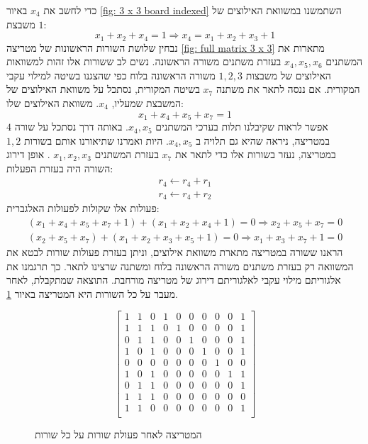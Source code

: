 \documentclass[12pt,leqno]{article}
\theoremstyle{theoremdd}
\begin{document}
כדי לחשב את 
$x_4$
באיור
\ref{fig: 3 x 3 board indexed}
השתמשנו במשוואת האילוצים של 
משבצת 
$1$:
\[
    x_1 + x_2 + x_4 = 1 \Rightarrow x_4 = x_1 + x_2 + x_3 + 1
\]
נבחין שלושת השורות הראשונות  
של מטריצה 
\ref{fig: full matrix 3 x 3}
מתארות את המשתנים 
$x_4, x_5, x_6$
בעזרת משתנים 
משורה הראשונה.
נשים לב ששורות אלו זהות למשוואות האילוצים של משבצות
$1,2,3$
משורה הראשונה
בלוח כפי שהצגנו בשיטה למילוי עקבי המקורית.
אם ננסה לתאר 
את משתנה 
$x_7$
בשיטה המקורית, נסתכל על משוואת האילוצים של המשבצת שמעליו,
$x_4$.
משוואת האילוצים שלו:
\[ x_1 + x_4 + x_5 + x_7 = 1 \]
אפשר לראות שקיבלנו תלות בערכי המשתנים 
$x_4, x_5$.
באותה דרך 
נסתכל על שורה 
$4$
במטריצה,
ניראה שהיא גם תלויה ב
$x_4, x_5$.
היות 
ואמרנו שתיאורנו אותם בשורות 
$1, 2$
במטריצה,
נעזר בשורות אלו כדי לתאר את 
$x_7$
בעזרת המשתנים 
$x_1, x_2, x_3$
.
אופן דירוג השורה היה בעזרת
הפעלות:
\begin{align*}
    r_4 \leftarrow r_4 + r_1
    \\
    r_4 \leftarrow r_4 + r_2
\end{align*}
פעולות אלו שקולות לפעולות האלגברית:
\begin{align*}
   (x_1 + x_4 + x_5 + x_7 + 1) + (x_1 + x_2 + x_4 + 1) = 0 \Rightarrow x_2 + x_5 + x_7 = 0
    \\
    (x_2 + x_5 + x_7) + (x_1 + x_2 + x_3 + x_5 + 1 ) = 0 \Rightarrow x_1 + x_3 + x_7 + 1 = 0
\end{align*}
הראנו ששורה במטריצה מתארת משוואת אילוצים,
וניתן בעזרת פעולות שורות לבטא את המשוואה
רק בעזרת משתנים משורה הראשונה בלוח ומשתנה שרצינו לתאר.
כך תרגמנו את אלגוריתם מילוי עקבי לאלגוריתם דירוג של מטריצה מורחבת.
התוצאה שמתקבלת, לאחר מעבר על כל השורות היא המטריצה 
באיור
\ref{fig: matrix after spanish}.

\begin{figure}[ht]
    \caption{המטריצה לאחר פעולת שורות על כל שורות}
    \label{fig: matrix after spanish}
    \begin{english}
        \begin{center}
            \[
                \left[
                \begin{array}{ccccccccc|c}
                1& 1& 0& 1& 0& 0& 0& 0& 0& 1 \\
                1& 1& 1& 0& 1& 0& 0& 0& 0& 1 \\
                0& 1& 1& 0& 0& 1& 0& 0& 0& 1 \\
                1& 0& 1& 0& 0& 0& 1& 0& 0& 1\\
                0& 0& 0& 0& 0& 0& 0& 1& 0& 0\\
                1& 0& 1& 0& 0& 0& 0& 0& 1& 1\\
                0& 1& 1& 0& 0& 0& 0& 0& 0& 1\\
                1& 1& 1& 0& 0& 0& 0& 0& 0& 0\\
                1& 1& 0& 0& 0& 0& 0& 0& 0& 1\\
            \end{array}
            \right]
            \]
        \end{center}       
    \end{english}
\end{figure}
\end{document}
